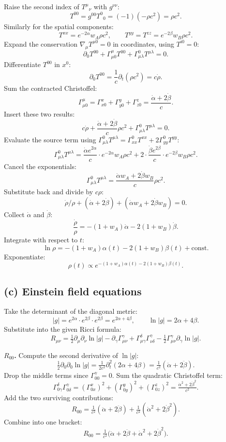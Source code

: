 \documentclass[11pt]{article}
\begin{document}
Raise the second index of $T^\mu{}_\nu$ with $g^{\nu\nu}$:
\[
T^{00}=g^{00}T^0{}_0=(-1)(-\rho c^2)=\rho c^2.
\]
Similarly for the spatial components:
\[
T^{xx}=e^{-2\alpha}w_A\rho c^2,\qquad T^{yy}=T^{zz}=e^{-2\beta}w_B\rho c^2.
\]
Expand the conservation $\nabla_\mu T^{\mu 0}=0$ in coordinates, using $T^{i0}=0$:
\[
\partial_0 T^{00}+\Gamma^\mu_{\mu 0}T^{00}+\Gamma^0_{\mu\lambda}T^{\mu\lambda}=0.
\]
Differentiate $T^{00}$ in $x^0$:
\[
\partial_0 T^{00}=\frac{1}{c}\partial_t(\rho c^2)=c\dot\rho.
\]
Sum the contracted Christoffel:
\[
\Gamma^\mu_{\mu 0}=\Gamma^x_{x0}+\Gamma^y_{y0}+\Gamma^z_{z0}=\frac{\dot\alpha+2\dot\beta}{c}.
\]
Insert these two results:
\[
c\dot\rho+\frac{\dot\alpha+2\dot\beta}{c}\rho c^2+\Gamma^0_{\mu\lambda}T^{\mu\lambda}=0.
\]
Evaluate the source term using $\Gamma^0_{\mu\lambda}T^{\mu\lambda}=\Gamma^0_{xx}T^{xx}+2\Gamma^0_{yy}T^{yy}$:
\[
\Gamma^0_{\mu\lambda}T^{\mu\lambda}=\frac{\dot\alpha e^{2\alpha}}{c}\cdot e^{-2\alpha}w_A\rho c^2+2\cdot\frac{\dot\beta e^{2\beta}}{c}\cdot e^{-2\beta}w_B\rho c^2.
\]
Cancel the exponentials:
\[
\Gamma^0_{\mu\lambda}T^{\mu\lambda}=\frac{\dot\alpha w_A+2\dot\beta w_B}{c}\rho c^2.
\]
Substitute back and divide by $c\rho$:
\[
\dot\rho/\rho+(\dot\alpha+2\dot\beta)+(\dot\alpha w_A+2\dot\beta w_B)=0.
\]
Collect $\dot\alpha$ and $\dot\beta$:
\[
\frac{\dot\rho}{\rho}=-(1+w_A)\dot\alpha-2(1+w_B)\dot\beta.
\]
Integrate with respect to $t$:
\[
\ln\rho=-(1+w_A)\alpha(t)-2(1+w_B)\beta(t)+\text{const}.
\]
Exponentiate:
\begin{equation}
\boxed{\ \rho(t)\propto e^{-(1+w_A)\alpha(t)-2(1+w_B)\beta(t)}.\ }
\label{eq:rhotbox}
\end{equation}

\subsection*{(c) Einstein field equations}

Take the determinant of the diagonal metric:
\[
|g|=e^{2\alpha}\cdot e^{2\beta}\cdot e^{2\beta}=e^{2\alpha+4\beta},\qquad \ln|g|=2\alpha+4\beta.
\]
Substitute into the given Ricci formula:
\[
R_{\mu\nu}=\tfrac12 \partial_\mu\partial_\nu\ln|g|-\partial_\gamma\Gamma^\gamma_{\mu\nu}+\Gamma^\delta_{\mu\gamma}\Gamma^\gamma_{\nu\delta}-\tfrac12 \Gamma^\gamma_{\mu\nu}\partial_\gamma\ln|g|.
\]

\textbf{$R_{00}$.} Compute the second derivative of $\ln|g|$:
\[
\tfrac12\partial_0\partial_0\ln|g|=\tfrac{1}{2c^2}\partial_t^2(2\alpha+4\beta)=\tfrac{1}{c^2}(\ddot\alpha+2\ddot\beta).
\]
Drop the middle terms since $\Gamma^\gamma_{00}=0$. Sum the quadratic Christoffel term:
\[
\Gamma^\delta_{0\gamma}\Gamma^\gamma_{0\delta}=(\Gamma^x_{0x})^2+(\Gamma^y_{0y})^2+(\Gamma^z_{0z})^2=\tfrac{\dot\alpha^2+2\dot\beta^2}{c^2}.
\]
Add the two surviving contributions:
\[
R_{00}=\tfrac{1}{c^2}(\ddot\alpha+2\ddot\beta)+\tfrac{1}{c^2}(\dot\alpha^2+2\dot\beta^2).
\]
Combine into one bracket:
\[
R_{00}=\tfrac{1}{c^2}\bigl(\ddot\alpha+2\ddot\beta+\dot\alpha^2+2\dot\beta^2\bigr).
\]
\end{document}
